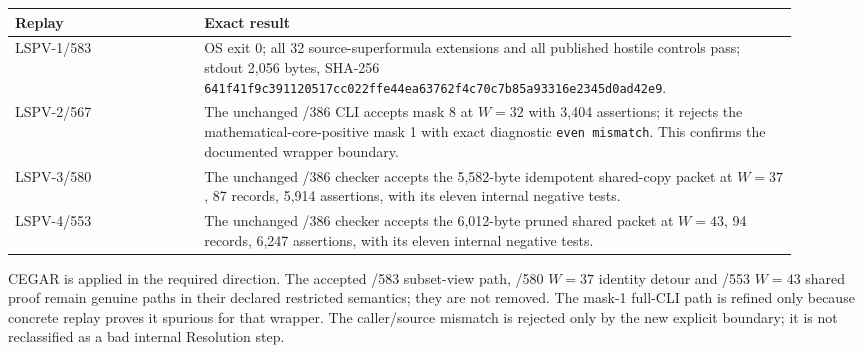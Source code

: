 \documentclass[11pt]{article}
\begin{document}
\begin{center}
\begin{tabular}{p{0.22\linewidth}p{0.69\linewidth}}
\toprule
Replay & Exact result \\
\midrule
LSPV-1/583 & OS exit 0; all 32 source-superformula extensions and all published hostile controls pass; stdout 2,056 bytes, SHA-256 \texttt{641f41f9c391120517cc022ffe44ea63762f4c70c7b85a93316e2345d0ad42e9}.\\
LSPV-2/567 & The unchanged /386 CLI accepts mask 8 at $W=32$ with 3,404 assertions; it rejects the mathematical-core-positive mask 1 with exact diagnostic \texttt{even mismatch}.  This confirms the documented wrapper boundary.\\
LSPV-3/580 & The unchanged /386 checker accepts the 5,582-byte idempotent shared-copy packet at $W=37$, 87 records, 5,914 assertions, with its eleven internal negative tests.\\
LSPV-4/553 & The unchanged /386 checker accepts the 6,012-byte pruned shared packet at $W=43$, 94 records, 6,247 assertions, with its eleven internal negative tests.\\
\bottomrule
\end{tabular}
\end{center}

CEGAR is applied in the required direction.  The accepted /583 subset-view
path, /580 $W=37$ identity detour and /553 $W=43$ shared proof remain genuine
paths in their declared restricted semantics; they are not removed.  The
mask-1 full-CLI path is refined only because concrete replay proves it
spurious for that wrapper.  The caller/source mismatch is rejected only by
the new explicit boundary; it is not reclassified as a bad internal
Resolution step.
\end{document}
